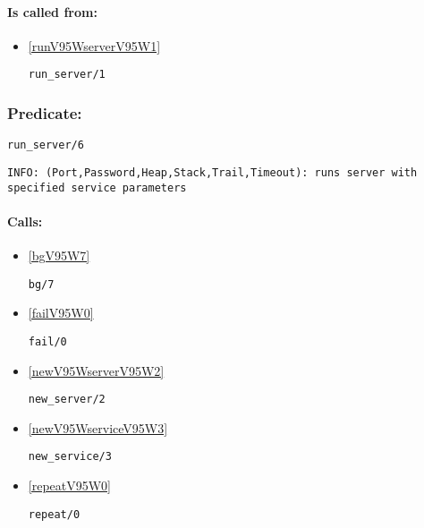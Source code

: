 \paragraph{Is called from:} 
\begin{itemize}
\item \ref{runV95WserverV95W1} 
\begin{verbatim}
run_server/1
\end{verbatim}

\end{itemize}

\subsubsection{Predicate:} \label{runV95WserverV95W6}

\begin{verbatim}
run_server/6
\end{verbatim}

{\small \begin{verbatim}
INFO: (Port,Password,Heap,Stack,Trail,Timeout): runs server with specified service parameters

\end{verbatim}}
\paragraph{Calls:} 
\begin{itemize}
\item \ref{bgV95W7} 
\begin{verbatim}
bg/7
\end{verbatim}

\item \ref{failV95W0} 
\begin{verbatim}
fail/0
\end{verbatim}

\item \ref{newV95WserverV95W2} 
\begin{verbatim}
new_server/2
\end{verbatim}

\item \ref{newV95WserviceV95W3} 
\begin{verbatim}
new_service/3
\end{verbatim}

\item \ref{repeatV95W0} 
\begin{verbatim}
repeat/0
\end{verbatim}

\end{itemize}
